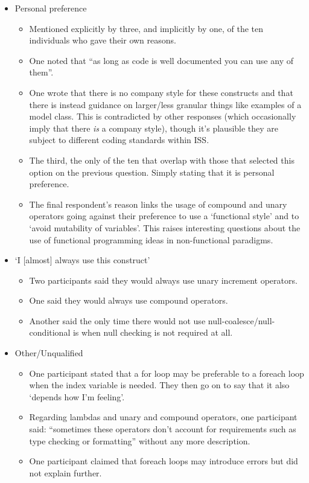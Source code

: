 \documentclass{article}
\begin{document}
            \begin{itemize}
                \item Personal preference
                \begin{itemize}
                    \item Mentioned explicitly by three, and implicitly by one, of the ten individuals who gave their own reasons.
                    \item One noted that ``as long as code is well documented you can use any of them''.
                    \item One wrote that there is no company style for these constructs and that there is instead guidance on larger/less granular things like examples of a model class. This is contradicted by other responses (which occasionally imply that there \emph{is} a company style), though it's plausible they are subject to different coding standards within ISS.
                    \item The third, the only of the ten that overlap with those that selected this option on the previous question. Simply stating that it is personal preference.
                    \item The final respondent's reason links the usage of compound and unary operators going against their preference to use a `functional style' and to `avoid mutability of variables'. This raises interesting questions about the use of functional programming ideas in non-functional paradigms.
                \end{itemize}
                \item `I [almost] always use this construct'
                \begin{itemize}
                    \item Two participants said they would always use unary increment operators.
                    \item One said they would always use compound operators.
                    \item Another said the only time there would not use null-coalesce/null-conditional is when null checking is not required at all.
                \end{itemize}
                \item Other/Unqualified
                \begin{itemize}
                    \item One participant stated that a for loop may be preferable to a foreach loop when the index variable is needed. They then go on to say that it also `depends how I'm feeling'.
                    \item Regarding lambdas and unary and compound operators, one participant said: ``sometimes these operators don't account for requirements such as type checking or formatting'' without any more description.
                    \item One participant claimed that foreach loops may introduce errors but did not explain further.
                \end{itemize}
            \end{itemize}
\end{document}
